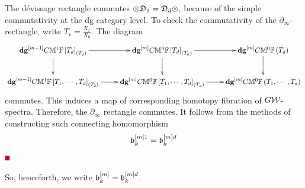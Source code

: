 \documentclass[12pt]{article}
\begin{document}
The d\'{e}vissage rectangle commutes $\otimes \mathfrak {D}_1= \mathfrak {D}_d\otimes$, because of the simple commutativity at the dg category level.  To check the commutativity of the  $\partial_{\infty}$-rectangle, write $T_r=\frac{X_r}{X_0}$. The 
diagram
$$
\diagram
{\bf dg}^{\LRt{m-1}} C{\BM}^1{\BF}\LRt{T_d}_{\LRf{T_2}} \ar[r] \ar[d]& {\bf dg}^{\LRt{m}} C{\BM}^0{\BF}\LRt{T_d}_{\LRf{T_d}} \ar[r]\ar[d] & {\bf dg}^{\LRt{m}} C{\BM}^0{\BF}\LRf{T_d} \ar[d]\\
{\bf dg}^{\LRt{m-1}} C{\BM}^1{\BF}\LRt{T_1, \cdots, T_d}_{\LRf{T_2}} \ar[r] & {\bf dg}^{\LRt{m}} C{\BM}^0{\BF}\LRt{T_1, 
\cdots, T_d}_{\LRf{T_d}} \ar[r] & {\bf dg}^{\LRt{m}} C{\BM}^0{\BF}\LRf{T_1, \cdots, T_d}\\
\enddiagram
$$
commutes. 
This induces a map of corresponding homotopy fibration of $G{\mathcal{W}}$-spectra. Therefore, the $\partial_{\infty}$ rectangle commutes. 
It follows from 
the methods of constructing such connecting homomorphism
$$
{\mathfrak {b}^{\left[ m\right]1}_k}={\mathfrak {b}^{\left[ m\right]d}_k}
$$
%
 \pic $\eop$

\vspace{3mm} 
So, henceforth, we  write $\mathfrak {b}^{\left[ m\right]}_k=\mathfrak {b}^{\left[ m\right]d}_k$. 

\end{document}
